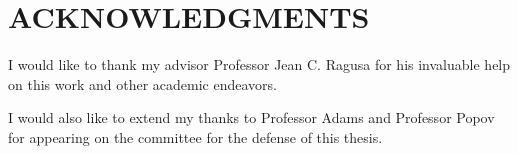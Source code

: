 \chapter*{ACKNOWLEDGMENTS}
I would like to thank my advisor Professor Jean C. Ragusa for his invaluable help on this work and other academic endeavors. 
 
I would also like to extend my thanks to Professor Adams and Professor Popov for appearing on the committee for the defense of this thesis.



\pagebreak{}
